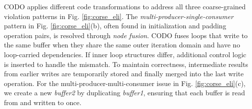 \documentclass[conference]{IEEEtran}
\begin{document}
CODO applies different code transformations to address all three coarse-grained violation patterns in Fig. \ref{fig:corse_eli}. The \textit{multi-producer-single-consumer} pattern in Fig. \ref{fig:corse_eli}(b), often found in initialization and padding operation pairs, is resolved through \textit{node fusion}. 
CODO fuses loops that write to the same buffer when they share the same outer iteration domain and have no loop-carried dependencies. If inner loop structures differ, additional control logic is inserted to handle the mismatch.
To maintain correctness, intermediate results from earlier writes are temporarily stored and finally merged into the last write operation.
For the multi-producer-multi-consumer issue in Fig. \ref{fig:corse_eli}(c), we create a new \textit{buffer2} by duplicating \textit{buffer1}, ensuring that each buffer is read from and written to once. 



        
        
\end{document}
